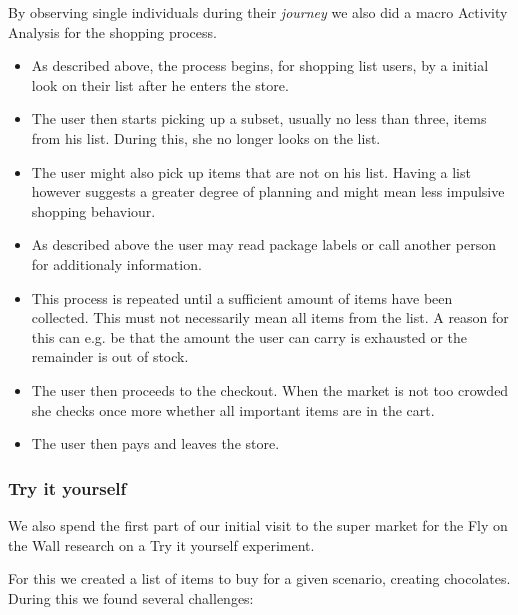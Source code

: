 \documentclass{scrartcl}
\begin{document}
      By observing single individuals during their \textit{journey} we also did a macro Activity Analysis for the shopping process.
      \begin{itemize}
        \item As described above, the process begins, for shopping list users, by a initial look on their list after he enters the store. 
        \item The user then starts picking up a subset, usually no less than three, items from his list. During this, she no longer looks on the list.
        \item The user might also pick up items that are not on his list. Having a list however suggests a greater degree of planning and might mean less impulsive shopping behaviour.
        \item As described above the user may read package labels or call another person for additionaly information.
        \item This process is repeated until a sufficient amount of items have been collected. 
          This must not necessarily mean all items from the list. A reason for this can e.g. be that the amount the user can carry is exhausted or the remainder is out of stock.
        \item The user then proceeds to the checkout. When the market is not too crowded she checks once more whether all important items are in the cart.
        \item The user then pays and leaves the store.
      \end{itemize}

    \subsubsection{Try it yourself}
      We also spend the first part of our initial visit to the super market for the Fly on the Wall research on a Try it yourself experiment.

      For this we created a list of items to buy for a given scenario, creating chocolates. 
      During this we found several challenges:
\end{document}
